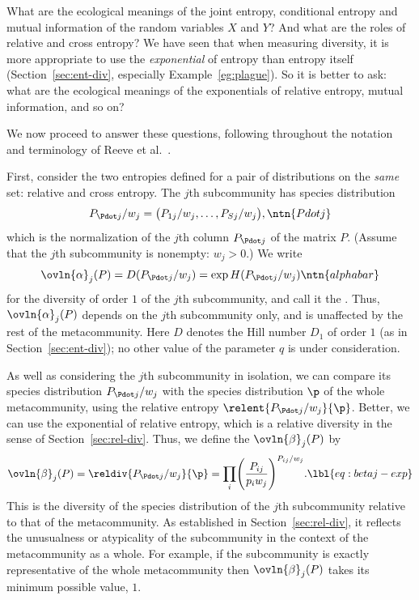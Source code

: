 What are the ecological meanings of the joint entropy, conditional entropy
and mutual information of the random variables $X$ and $Y$?  And what are
the roles of relative and cross entropy?  We have seen that when measuring
diversity, it is more appropriate to use the \emph{exponential} of entropy
than entropy itself (Section~\ref{sec:ent-div}, especially
Example~\ref{eg:plague}).  So it is better to ask: what are the ecological
meanings of the exponentials of relative entropy, mutual information, and
so on?

We now proceed to answer these questions, following throughout the notation and
terminology of Reeve et al.~\cite{HPD}.  

First, consider the two entropies defined for a pair of
distributions on the \emph{same} set: relative and cross entropy.  The
$j$th subcommunity has species distribution
\[
P_{\Pdot j}/w_j
=
\bigl( P_{1j}/w_j, \ldots, P_{Sj}/w_j \bigr),
\ntn{Pdotj}
\]
which is the normalization of the $j$th column $P_{\Pdot j}$ of the matrix
$P$.  (Assume that the $j$th subcommunity is nonempty: $w_j > 0$.)
We write
\[
\ovln{\alpha}_j(P) 
=
D(P_{\Pdot j}/w_j)
=
\exp H(P_{\Pdot j}/w_j)
\ntn{alphabar}
\]
for the diversity of order $1$ of the $j$th subcommunity, and call it the
.%
%
%
% 
Thus, $\ovln{\alpha}_j(P)$ depends on the $j$th subcommunity only, and is
unaffected by the rest of the metacommunity.  Here $D$ denotes the
Hill number $D_1$ of order $1$ (as in Section~\ref{sec:ent-div}); 
no other value of the parameter $q$ is under consideration.

As well as considering the $j$th subcommunity in isolation, we can compare
its species distribution $P_{\Pdot j}/w_j$ with the species distribution
$\p$ of the whole metacommunity, using the relative entropy
$\relent{P_{\Pdot j}/w_j}{\p}$.  Better, we can use the exponential of
relative entropy, which is a relative%
%
%  
diversity in the sense of Section~\ref{sec:rel-div}.  Thus, we define the
 $\ovln{\beta}_j(P)$ by
% 
\begin{equation}
\ovln{\beta}_j(P)       
=
\reldiv{P_{\Pdot j}/w_j}{\p}
=
\prod_i \Biggl( \frac{P_{ij}}{p_i w_j} \Biggr)^{P_{ij}/w_j}.
\lbl{eq:betaj-exp}      
\end{equation}
% 
This is the diversity of the species distribution of the $j$th subcommunity
relative to that of the metacommunity.  As established in
Section~\ref{sec:rel-div}, it reflects the unusualness or atypicality of
the subcommunity in the context of the metacommunity as a whole.  For
example, if the subcommunity is exactly representative of the whole
metacommunity then $\ovln{\beta}_j(P)$ takes its minimum possible value, $1$. 

